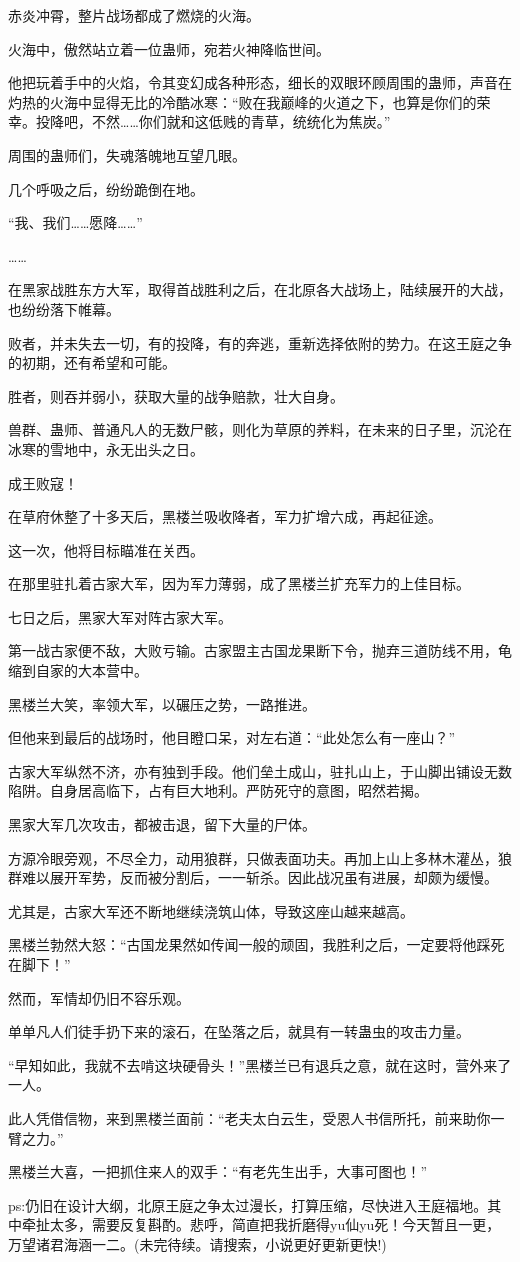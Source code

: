 \begin{this_body}
赤炎冲霄，整片战场都成了燃烧的火海。

火海中，傲然站立着一位蛊师，宛若火神降临世间。

他把玩着手中的火焰，令其变幻成各种形态，细长的双眼环顾周围的蛊师，声音在灼热的火海中显得无比的冷酷冰寒：“败在我巅峰的火道之下，也算是你们的荣幸。投降吧，不然……你们就和这低贱的青草，统统化为焦炭。”

周围的蛊师们，失魂落魄地互望几眼。

几个呼吸之后，纷纷跪倒在地。

“我、我们……愿降……”

……

在黑家战胜东方大军，取得首战胜利之后，在北原各大战场上，陆续展开的大战，也纷纷落下帷幕。

败者，并未失去一切，有的投降，有的奔逃，重新选择依附的势力。在这王庭之争的初期，还有希望和可能。

胜者，则吞并弱小，获取大量的战争赔款，壮大自身。

兽群、蛊师、普通凡人的无数尸骸，则化为草原的养料，在未来的日子里，沉沦在冰寒的雪地中，永无出头之日。

成王败寇！

在草府休整了十多天后，黑楼兰吸收降者，军力扩增六成，再起征途。

这一次，他将目标瞄准在关西。

在那里驻扎着古家大军，因为军力薄弱，成了黑楼兰扩充军力的上佳目标。

七日之后，黑家大军对阵古家大军。

第一战古家便不敌，大败亏输。古家盟主古国龙果断下令，抛弃三道防线不用，龟缩到自家的大本营中。

黑楼兰大笑，率领大军，以碾压之势，一路推进。

但他来到最后的战场时，他目瞪口呆，对左右道：“此处怎么有一座山？”

古家大军纵然不济，亦有独到手段。他们垒土成山，驻扎山上，于山脚出铺设无数陷阱。自身居高临下，占有巨大地利。严防死守的意图，昭然若揭。

黑家大军几次攻击，都被击退，留下大量的尸体。

方源冷眼旁观，不尽全力，动用狼群，只做表面功夫。再加上山上多林木灌丛，狼群难以展开军势，反而被分割后，一一斩杀。因此战况虽有进展，却颇为缓慢。

尤其是，古家大军还不断地继续浇筑山体，导致这座山越来越高。

黑楼兰勃然大怒：“古国龙果然如传闻一般的顽固，我胜利之后，一定要将他踩死在脚下！”

然而，军情却仍旧不容乐观。

单单凡人们徒手扔下来的滚石，在坠落之后，就具有一转蛊虫的攻击力量。

“早知如此，我就不去啃这块硬骨头！”黑楼兰已有退兵之意，就在这时，营外来了一人。

此人凭借信物，来到黑楼兰面前：“老夫太白云生，受恩人书信所托，前来助你一臂之力。”

黑楼兰大喜，一把抓住来人的双手：“有老先生出手，大事可图也！”

ps:仍旧在设计大纲，北原王庭之争太过漫长，打算压缩，尽快进入王庭福地。其中牵扯太多，需要反复斟酌。悲呼，简直把我折磨得yu仙yu死！今天暂且一更，万望诸君海涵一二。(未完待续。请搜索，小说更好更新更快!)

\end{this_body}

